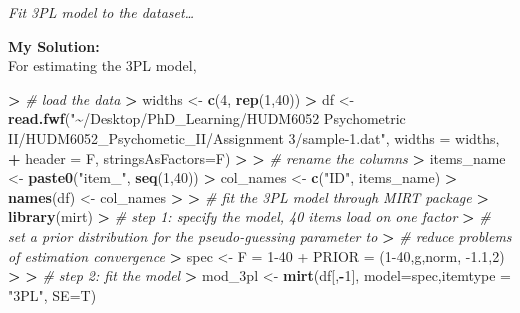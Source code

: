 \documentclass[
]{article}
\newenvironment{Shaded}{\begin{snugshade}}{\end{snugshade}}
\newcommand{\AttributeTok}[1]{\textcolor[rgb]{0.13,0.29,0.53}{#1}}
\newcommand{\CommentTok}[1]{\textcolor[rgb]{0.56,0.35,0.01}{\textit{#1}}}
\newcommand{\DecValTok}[1]{\textcolor[rgb]{0.00,0.00,0.81}{#1}}
\newcommand{\ErrorTok}[1]{\textcolor[rgb]{0.64,0.00,0.00}{\textbf{#1}}}
\newcommand{\FunctionTok}[1]{\textcolor[rgb]{0.13,0.29,0.53}{\textbf{#1}}}
\newcommand{\NormalTok}[1]{#1}
\newcommand{\OtherTok}[1]{\textcolor[rgb]{0.56,0.35,0.01}{#1}}
\newcommand{\SpecialCharTok}[1]{\textcolor[rgb]{0.81,0.36,0.00}{\textbf{#1}}}
\newcommand{\StringTok}[1]{\textcolor[rgb]{0.31,0.60,0.02}{#1}}
\begin{document}
\emph{Fit 3PL model to the dataset\ldots{}}

\textbf{My Solution:}\\
For estimating the 3PL model,

\begin{Shaded}
\begin{Highlighting}[]
\SpecialCharTok{\textgreater{}} \CommentTok{\# load the data}
\ErrorTok{\textgreater{}}\NormalTok{ widths }\OtherTok{\textless{}{-}} \FunctionTok{c}\NormalTok{(}\DecValTok{4}\NormalTok{, }\FunctionTok{rep}\NormalTok{(}\DecValTok{1}\NormalTok{,}\DecValTok{40}\NormalTok{))}
\SpecialCharTok{\textgreater{}}\NormalTok{ df }\OtherTok{\textless{}{-}} \FunctionTok{read.fwf}\NormalTok{(}\StringTok{"\textasciitilde{}/Desktop/PhD\_Learning/HUDM6052 Psychometric II/HUDM6052\_Psychometic\_II/Assignment 3/sample{-}1.dat"}\NormalTok{, }\AttributeTok{widths =}\NormalTok{ widths,}
\SpecialCharTok{+}                \AttributeTok{header =}\NormalTok{ F, }\AttributeTok{stringsAsFactors=}\NormalTok{F)}
\SpecialCharTok{\textgreater{}} 
\ErrorTok{\textgreater{}} \CommentTok{\# rename the columns}
\ErrorTok{\textgreater{}}\NormalTok{ items\_name }\OtherTok{\textless{}{-}} \FunctionTok{paste0}\NormalTok{(}\StringTok{"item\_"}\NormalTok{, }\FunctionTok{seq}\NormalTok{(}\DecValTok{1}\NormalTok{,}\DecValTok{40}\NormalTok{))}
\SpecialCharTok{\textgreater{}}\NormalTok{ col\_names }\OtherTok{\textless{}{-}} \FunctionTok{c}\NormalTok{(}\StringTok{"ID"}\NormalTok{, items\_name)}
\SpecialCharTok{\textgreater{}} \FunctionTok{names}\NormalTok{(df) }\OtherTok{\textless{}{-}}\NormalTok{ col\_names}
\SpecialCharTok{\textgreater{}} 
\ErrorTok{\textgreater{}} \CommentTok{\# fit the 3PL model through MIRT package}
\ErrorTok{\textgreater{}} \FunctionTok{library}\NormalTok{(mirt)}
\SpecialCharTok{\textgreater{}} \CommentTok{\# step 1: specify the model, 40 items load on one factor}
\ErrorTok{\textgreater{}} \CommentTok{\#         set a prior distribution for the pseudo{-}guessing parameter to}
\ErrorTok{\textgreater{}} \CommentTok{\#         reduce problems of estimation convergence}
\ErrorTok{\textgreater{}}\NormalTok{ spec }\OtherTok{\textless{}{-}} \StringTok{\textquotesingle{}F = 1{-}40}
\StringTok{+ PRIOR = (1{-}40,g,norm, {-}1.1,2)\textquotesingle{}}
\SpecialCharTok{\textgreater{}} 
\ErrorTok{\textgreater{}} \CommentTok{\# step 2: fit the model}
\ErrorTok{\textgreater{}}\NormalTok{ mod\_3pl }\OtherTok{\textless{}{-}} \FunctionTok{mirt}\NormalTok{(df[,}\SpecialCharTok{{-}}\DecValTok{1}\NormalTok{], }\AttributeTok{model=}\NormalTok{spec,}\AttributeTok{itemtype =} \StringTok{"3PL"}\NormalTok{, }\AttributeTok{SE=}\NormalTok{T)}

\end{Highlighting}
\end{Shaded}
\end{document}
